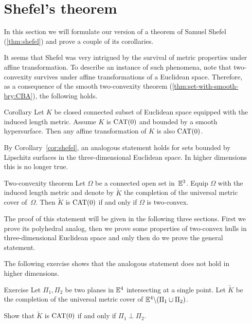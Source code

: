\section{Shefel's theorem}

In this section we will formulate our version of a theorem of Samuel Shefel (\ref{thm:shefel}) and prove a couple of its corollaries.

It seems that Shefel was very intrigued by the survival of metric properties under affine transformation.
To describe an instance of such phenomena,
note that two-convexity survives under affine transformations of a Euclidean space.
Therefore, as a consequence of the smooth two-convexity theorem (\ref{thm:set-with-smooth-bry:CBA}), the following holds.

\begin{thm}{Corollary}
Let $K$ be closed connected subset of Euclidean space 
equipped with the induced length metric.
Assume $K$ is $\mathrm{CAT}(0)$ and bounded by a smooth hypersurface. 
Then any affine transformation of $K$ is also $\mathrm{CAT}(0)$.
\end{thm}

By Corollary~\ref{cor:shefel}, an analogous statement holds for sets bounded by Lipschitz surfaces in the three-dimensional Euclidean space.
In higher dimensions this is no longer true.

\begin{thm}{Two-convexity theorem}\label{thm:shefel}
Let $\Omega$ be a connected open set in~$\mathbb{E}^3$.
Equip $\Omega$ with the induced length metric
and denote by $\tilde K$ the completion of the universal metric cover of~$\Omega$.
Then $\tilde K$ is $\mathrm{CAT}(0)$  
if and only if $\Omega$ is two-convex.
\end{thm}

The proof of this statement will be given in the following three sections.
First we prove its polyhedral analog, then we prove some properties of two-convex hulls in three-dimensional Euclidean space and only then do we prove the general statement. 

The following exercise shows that the analogous statement does not hold in higher dimensions.

\begin{thm}{Exercise}\label{ex:two-planes}
Let $\Pi_1,\Pi_2$ be two planes in $\mathbb{E}^4$ intersecting at a single point.
Let $\tilde K$ be the completion of the universal metric cover of $\mathbb{E}^4\backslash(\Pi_1\cup\Pi_2)$.

Show that 
$\tilde K$ is $\mathrm{CAT}(0)$ if and only if $\Pi_1\perp\Pi_2$.

\end{thm}

